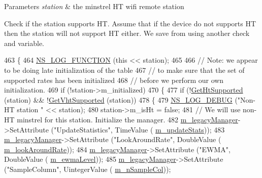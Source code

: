 \begin{DoxyParams}{Parameters}
{\em station} & the minstrel HT wifi remote station \\
\hline
\end{DoxyParams}
Check if the station supports HT. Assume that if the device do not supports HT then the station will not support HT either. We save from using another check and variable.
\begin{DoxyCode}
463 \{
464   \hyperlink{log-macros-disabled_8h_a90b90d5bad1f39cb1b64923ea94c0761}{NS\_LOG\_FUNCTION} (\textcolor{keyword}{this} << station);
465 
466   \textcolor{comment}{// Note: we appear to be doing late initialization of the table}
467   \textcolor{comment}{// to make sure that the set of supported rates has been initialized}
468   \textcolor{comment}{// before we perform our own initialization.}
469   \textcolor{keywordflow}{if} (!station->m\_initialized)
470     \{
477       \textcolor{keywordflow}{if} (!\hyperlink{classns3_1_1WifiRemoteStationManager_a84f0f86ec191bd3a00c531f1e9639f96}{GetHtSupported} (station) && !\hyperlink{classns3_1_1WifiRemoteStationManager_aecf5ed3203b9b55cd831696a08daa5fe}{GetVhtSupported} (station))
478         \{
479           \hyperlink{group__logging_ga413f1886406d49f59a6a0a89b77b4d0a}{NS\_LOG\_DEBUG} (\textcolor{stringliteral}{"Non-HT station "} << station);
480           station->m\_isHt = \textcolor{keyword}{false};
481           \textcolor{comment}{// We will use non-HT minstrel for this station. Initialize the manager.}
482           \hyperlink{classns3_1_1MinstrelHtWifiManager_ae10ffd948e46a60593b1aef80372082a}{m\_legacyManager}->SetAttribute (\textcolor{stringliteral}{"UpdateStatistics"}, TimeValue (
      \hyperlink{classns3_1_1MinstrelHtWifiManager_a5c7d923b77d5cd3a1d38810ed41f91f8}{m\_updateStats}));
483           \hyperlink{classns3_1_1MinstrelHtWifiManager_ae10ffd948e46a60593b1aef80372082a}{m\_legacyManager}->SetAttribute (\textcolor{stringliteral}{"LookAroundRate"}, DoubleValue (
      \hyperlink{classns3_1_1MinstrelHtWifiManager_a7db397626b2dff4bd62619aa7fec75af}{m\_lookAroundRate}));
484           \hyperlink{classns3_1_1MinstrelHtWifiManager_ae10ffd948e46a60593b1aef80372082a}{m\_legacyManager}->SetAttribute (\textcolor{stringliteral}{"EWMA"}, DoubleValue (
      \hyperlink{classns3_1_1MinstrelHtWifiManager_ace0a340f6c702f416f3dc9fed71105d1}{m\_ewmaLevel}));
485           \hyperlink{classns3_1_1MinstrelHtWifiManager_ae10ffd948e46a60593b1aef80372082a}{m\_legacyManager}->SetAttribute (\textcolor{stringliteral}{"SampleColumn"}, UintegerValue (
      \hyperlink{classns3_1_1MinstrelHtWifiManager_afc2db9ea273b3599cb09ccbf73f866e0}{m\_nSampleCol}));

\end{DoxyCode}

